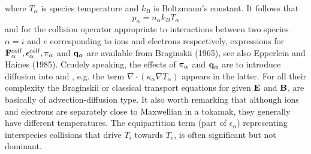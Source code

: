 where $T_\alpha $ is species temperature and $k_B$ is Boltzmann's constant.  It 
follows that
\label{eq:e2.11}
\begin{equation}
p_\alpha = n_\alpha k_BT_\alpha
\end{equation}
and for the collision operator appropriate to interactions between two 
species $\alpha=i$ and $e$ corresponding to ions and electrons 
respectively, expressions for ${\bf F}_\alpha^{coll}, \epsilon_\alpha^{coll}, 
{\bf \pi}_\alpha$ and ${\bf q}_\alpha$ are available from Braginskii (1965), see also Epperlein
and Haines (1985).  Crudely speaking, the effects of ${\bf \pi}_\alpha$ and ${\bf q}_\alpha$ are
to introduce diffusion into   and , e.g. the term $\nabla \cdot (\kappa_\alpha \nabla
T_\alpha)$ appears in the  latter.  For all their complexity the Braginskii or classical 
transport equations for  given ${\bf E}$ and ${\bf B}$, are basically of 
advection-diffusion type.  It also worth remarking that although  ions and electrons
are separately close to Maxwellian in a tokamak,  they generally have different
temperatures.  The equipartition term  (part of $\epsilon_\alpha$) representing
interspecies collisions that drive $T_i$ towards $T_e$, is often significant  but not
dominant.

